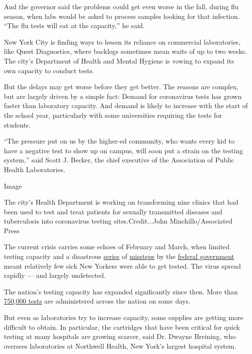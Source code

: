 And the governor said the problems could get even worse in the fall,
during flu season, when labs would be asked to process samples looking
for that infection. ``The flu tests will eat at the capacity,'' he said.

New York City is finding ways to lessen its reliance on commercial
laboratories, like Quest Diagnostics, where backlogs sometimes mean
waits of up to two weeks. The city's Department of Health and Mental
Hygiene is vowing to expand its own capacity to conduct tests.

But the delays may get worse before they get better. The reasons are
complex, but are largely driven by a simple fact: Demand for coronavirus
tests has grown faster than laboratory capacity. And demand is likely to
increase with the start of the school year, particularly with some
universities requiring the tests for students.

``The pressure put on us by the higher-ed community, who wants every kid
to have a negative test to show up on campus, will soon put a strain on
the testing system,'' said Scott J. Becker, the chief executive of the
Association of Public Health Laboratories.

Image

The city's Health Department is working on transforming nine clinics
that had been used to test and treat patients for sexually transmitted
diseases and tuberculosis into coronavirus testing sites.Credit...John
Minchillo/Associated Press

The current crisis carries some echoes of February and March, when
limited testing capacity and a disastrous
\href{https://www.nytimes.com/2020/04/18/health/cdc-coronavirus-lab-contamination-testing.html}{series}
of
\href{https://www.nytimes.com/2020/03/28/us/testing-coronavirus-pandemic.html}{missteps}
by the
\href{https://www.nytimes.com/2020/06/03/us/cdc-coronavirus.html}{federal
government} meant relatively few sick New Yorkers were able to get
tested. The virus spread rapidly --- and largely undetected.

The nation's testing capacity has expanded significantly since then.
More than
\href{https://coronavirus.jhu.edu/testing/individual-states/usa}{750,000
tests} are administered across the nation on some days.

But even as laboratories try to increase capacity, some supplies are
getting more difficult to obtain. In particular, the cartridges that
have been critical for quick testing at many hospitals are growing
scarcer, said Dr. Dwayne Breining, who oversees laboratories at
Northwell Health, New York's largest hospital system.

